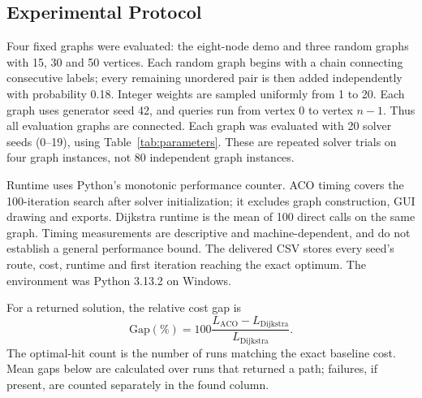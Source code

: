 \documentclass[conference]{IEEEtran}
\begin{document}
\subsection{Experimental Protocol}
Four fixed graphs were evaluated: the eight-node demo and three random graphs with 15, 30 and 50 vertices. Each random graph begins with a chain connecting consecutive labels; every remaining unordered pair is then added independently with probability 0.18. Integer weights are sampled uniformly from 1 to 20. Each graph uses generator seed 42, and queries run from vertex 0 to vertex $n-1$. Thus all evaluation graphs are connected. Each graph was evaluated with 20 solver seeds (0--19), using Table~\ref{tab:parameters}. These are repeated solver trials on four graph instances, not 80 independent graph instances.

Runtime uses Python's monotonic performance counter. ACO timing covers the 100-iteration search after solver initialization; it excludes graph construction, GUI drawing and exports. Dijkstra runtime is the mean of 100 direct calls on the same graph. Timing measurements are descriptive and machine-dependent, and do not establish a general performance bound. The delivered CSV stores every seed's route, cost, runtime and first iteration reaching the exact optimum. The environment was Python 3.13.2 on Windows.

For a returned solution, the relative cost gap is
\begin{equation}
\mathrm{Gap}(\%)=100\frac{L_{\mathrm{ACO}}-L_{\mathrm{Dijkstra}}}{L_{\mathrm{Dijkstra}}}.
\end{equation}
The optimal-hit count is the number of runs matching the exact baseline cost. Mean gaps below are calculated over runs that returned a path; failures, if present, are counted separately in the found column.
\end{document}
